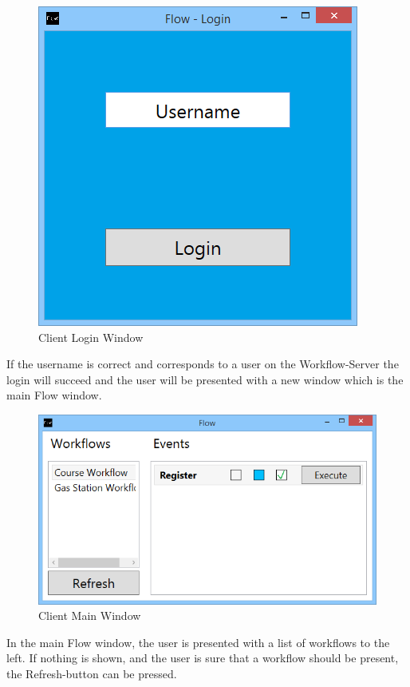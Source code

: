 \begin{figure}[htbp]
\centering
\includegraphics{ClientLogin.png}
\caption{Client Login Window}
\end{figure}

If the username is correct and corresponds to a user on the
Workflow-Server the login will succeed and the user will be presented
with a new window which is the main Flow window.

\begin{figure}[htbp]
\centering
\includegraphics{ClientMainView.png}
\caption{Client Main Window}
\end{figure}

In the main Flow window, the user is presented with a list of workflows
to the left. If nothing is shown, and the user is sure that a workflow
should be present, the Refresh-button can be pressed.


